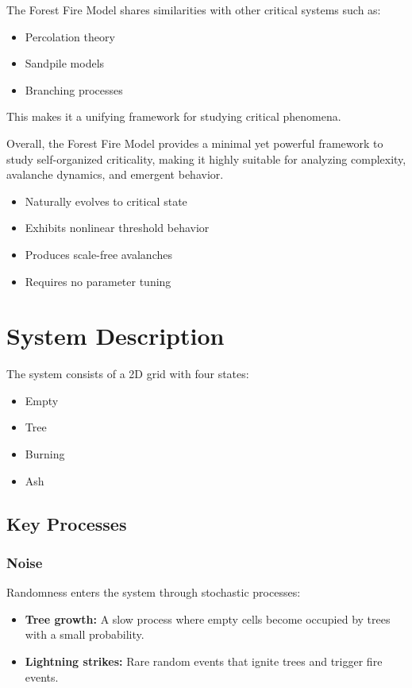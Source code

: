 \documentclass[12pt,a4paper]{article}
\begin{document}
The Forest Fire Model shares similarities with other critical systems such as:
\begin{itemize}
\item Percolation theory
\item Sandpile models
\item Branching processes
\end{itemize}

This makes it a unifying framework for studying critical phenomena.

\bigskip

Overall, the Forest Fire Model provides a minimal yet powerful framework to study self-organized criticality, making it highly suitable for analyzing complexity, avalanche dynamics, and emergent behavior.
\begin{itemize}
\item Naturally evolves to critical state
\item Exhibits nonlinear threshold behavior
\item Produces scale-free avalanches
\item Requires no parameter tuning
\end{itemize}

\section{System Description }

The system consists of a 2D grid with four states:
\begin{itemize}
\item Empty
\item Tree
\item Burning
\item Ash
\end{itemize}

\subsection{Key Processes}

\subsubsection{Noise}

Randomness enters the system through stochastic processes:

\begin{itemize}
\item \textbf{Tree growth:} A slow process where empty cells become occupied by trees with a small probability.
\item \textbf{Lightning strikes:} Rare random events that ignite trees and trigger fire events.
\end{itemize}
\end{document}
